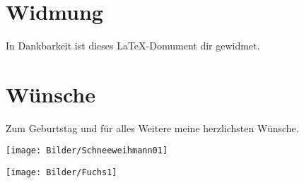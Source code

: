 \documentclass[12pt,ngerman,parskip=full]{scrreprt}
\begin{document}
\section{Widmung}
In Dankbarkeit ist dieses \LaTeX-Domument dir gewidmet.
\section{Wünsche}
Zum Geburtstag und für alles Weitere meine herzlichsten Wünsche.

\begin{center}
\texttt{[image: Bilder/Schneeweihmann01]}\label{fig:Schneeweihmann01}
\end{center}

\begin{center}
\texttt{[image: Bilder/Fuchs1]}\label{fig:Fuchs1}
\end{center}
\end{document}
